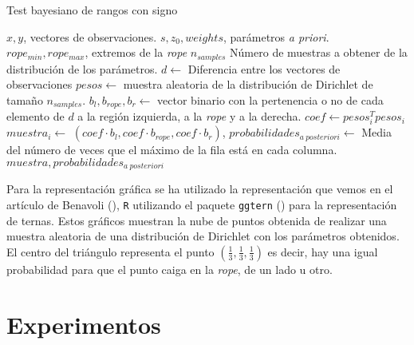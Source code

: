 \begin{algorithm}[H]
	\caption{Test bayesiano de rangos con signo}
	\label{alg:TBRS}
	\begin{algorithmic}[1]
	\REQUIRE $x, y$, vectores de observaciones.
	\REQUIRE $s, z_0, weights$, parámetros \textit{a priori}.
	\REQUIRE $rope_{min}, rope_{max}$, extremos de la \textit{rope}
	\REQUIRE $n_{samples}$ Número de muestras a obtener de
		la distribución de los parámetros.
	\STATE $d \leftarrow$ Diferencia entre los vectores 
		de observaciones 
	\STATE $pesos \leftarrow$ muestra aleatoria de 
		la distribución de Dirichlet de tamaño $n_{samples}$.
	\STATE $b_l, b_{rope}, b_r \leftarrow$ vector binario con
		la pertenencia o no de cada elemento de $d$ a la 
		región izquierda, a la \textit{rope} y a la derecha.
		\STATE $coef \leftarrow pesos_i^T pesos_i$
		\STATE $muestra_i \leftarrow$
			$(coef \cdot b_l, coef \cdot b_{rope}, 
			coef \cdot b_r)$,  
	\ENDFOR
	\STATE $probabilidades_{a\ posteriori} \leftarrow $
		Media del número de veces que el máximo de la fila 
		está en cada columna.
	\RETURN $muestra, probabilidades_{a\ posteriori}$
	\end{algorithmic}
\end{algorithm} 


Para la representación gráfica se ha utilizado
la representación que vemos en el artículo
de Benavoli (\cite{DBLP:journals/corr/BenavoliCDZ16}),
\texttt{R} utilizando el paquete \texttt{ggtern} (\cite{ggtern})
para la representación de ternas. Estos gráficos
muestran la nube de puntos obtenida de realizar
una muestra aleatoria de una distribución
de Dirichlet con los parámetros obtenidos.
El centro del triángulo representa el punto
$\left( \frac{1}{3}, \frac{1}{3}, \frac{1}{3} \right)$
es decir, hay una igual probabilidad para que el punto
caiga en la \textit{rope}, de un lado u otro.\\



\chapter{Experimentos}
\label{chapter:experimentos}
